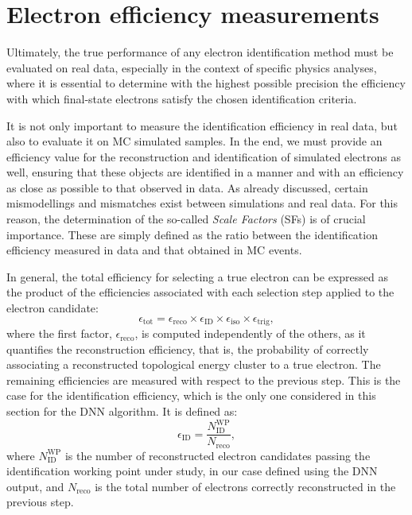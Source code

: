 \section{Electron efficiency measurements}
\label{sec:electron_efficiency_measurements}

Ultimately, the true performance of any electron identification method must be evaluated on real data, especially in the context of specific physics analyses, where it is essential to determine with the highest possible precision the efficiency with which final-state electrons satisfy the chosen identification criteria.  

It is not only important to measure the identification efficiency in real data, but also to evaluate it on MC simulated samples. In the end, we must provide an efficiency value for the reconstruction and identification of simulated electrons as well, ensuring that these objects are identified in a manner and with an efficiency as close as possible to that observed in data. As already discussed, certain mismodellings and mismatches exist between simulations and real data. For this reason, the determination of the so-called \emph{Scale Factors} (SFs) is of crucial importance. These are simply defined as the ratio between the identification efficiency measured in data and that obtained in MC events.

In general, the total efficiency for selecting a true electron can be expressed as the product of the efficiencies associated with each selection step applied to the electron candidate:
\begin{equation}
  \epsilon_{\text{tot}} = \epsilon_{\text{reco}} \times \epsilon_{\text{ID}} \times \epsilon_{\text{iso}} \times \epsilon_{\text{trig}},
\end{equation}
where the first factor, $\epsilon_{\text{reco}}$, is computed independently of the others, as it quantifies the reconstruction efficiency, that is, the probability of correctly associating a reconstructed topological energy cluster to a true electron. The remaining efficiencies are measured with respect to the previous step. This is the case for the identification efficiency, which is the only one considered in this section for the DNN algorithm. It is defined as:
\begin{equation}
  \epsilon_{\text{ID}} = \frac{N^{\text{WP}}_{\text{ID}}}{N_{\text{reco}}},
\label{eq:id_eff}  
\end{equation}
where $N^{\text{WP}}_{\text{ID}}$ is the number of reconstructed electron candidates passing the identification working point under study, in our case defined using the DNN output, and $N_{\text{reco}}$ is the total number of electrons correctly reconstructed in the previous step.

